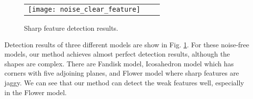 \begin{figure}[htbp]
\begin{center}
    \begin{tabular}{c c c}
        \texttt{[image: noise\_clear\_feature]}
    \end{tabular}
    \caption{Sharp feature detection results.\label{fig:noise_free_feature}}
\end{center}
\end{figure}
Detection results of three different models are show in Fig. \ref{fig:noise_free_feature}.
%
For these noise-free models, our method achieves almost perfect detection results, although the shapes are complex. There are Fandisk model, Icosahedron model which has corners with five adjoining planes, and Flower model where sharp features are jaggy.
%
We can see that our method can detect the weak features well, especially in the Flower model.


